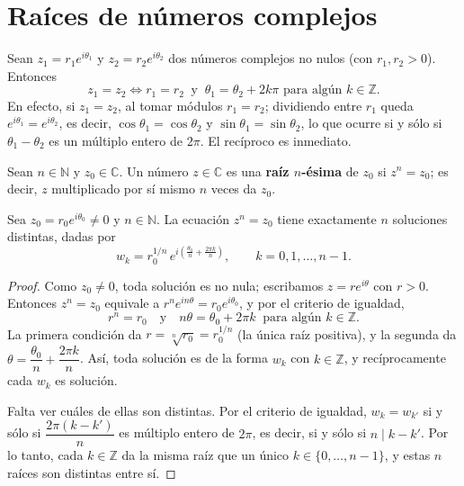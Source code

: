 \documentclass[12pt,a4paper]{book}
\begin{document}
  \section{Raíces de números complejos}

  Sean $z_1=r_1e^{i\theta_1}$ y $z_2=r_2e^{i\theta_2}$ dos números complejos no nulos (con $r_1,r_2>0$). Entonces
  \begin{equation*}
    z_1=z_2 \iff r_1=r_2 \ \text{ y } \ \theta_1=\theta_2+2k\pi \text{ para algún } k\in\mathbb{Z}.
  \end{equation*}
  En efecto, si $z_1=z_2$, al tomar módulos $r_1=r_2$; dividiendo entre $r_1$ queda $e^{i\theta_1}=e^{i\theta_2}$, es decir, $\cos\theta_1=\cos\theta_2$ y $\sin\theta_1=\sin\theta_2$, lo que ocurre si y sólo si $\theta_1-\theta_2$ es un múltiplo entero de $2\pi$. El recíproco es inmediato.

  \begin{definicion}
    Sean $n\in\mathbb{N}$ y $z_0\in\mathbb{C}$. Un número $z\in\mathbb{C}$ es una \textbf{raíz $n$-ésima} de $z_0$ si $z^n=z_0$; es decir, $z$ multiplicado por sí mismo $n$ veces da $z_0$.
  \end{definicion}

  \begin{teorema}
    Sea $z_0=r_0e^{i\theta_0}\neq 0$ y $n\in\mathbb{N}$. La ecuación $z^n=z_0$ tiene exactamente $n$ soluciones distintas, dadas por
    \begin{equation*}
      w_k=r_0^{1/n}\,e^{i\left(\frac{\theta_0}{n}+\frac{2\pi k}{n}\right)}, \qquad k=0,1,\dots,n-1.
    \end{equation*}
  \end{teorema}

  \begin{proof}
    Como $z_0\neq 0$, toda solución es no nula; escribamos $z=re^{i\theta}$ con $r>0$. Entonces $z^n=z_0$ equivale a $r^ne^{in\theta}=r_0e^{i\theta_0}$, y por el criterio de igualdad,
    \begin{equation*}
      r^n=r_0 \quad\text{y}\quad n\theta=\theta_0+2\pi k\ \text{ para algún } k\in\mathbb{Z}.
    \end{equation*}
    La primera condición da $r=\sqrt[n]{r_0}=r_0^{1/n}$ (la única raíz positiva), y la segunda da $\theta=\dfrac{\theta_0}{n}+\dfrac{2\pi k}{n}$. Así, toda solución es de la forma $w_k$ con $k\in\mathbb{Z}$, y recíprocamente cada $w_k$ es solución.

    Falta ver cuáles de ellas son distintas. Por el criterio de igualdad, $w_k=w_{k'}$ si y sólo si $\dfrac{2\pi(k-k')}{n}$ es múltiplo entero de $2\pi$, es decir, si y sólo si $n\mid k-k'$. Por lo tanto, cada $k\in\mathbb{Z}$ da la misma raíz que un único $k\in\{0,\dots,n-1\}$, y estas $n$ raíces son distintas entre sí.
  \end{proof}
\end{document}
